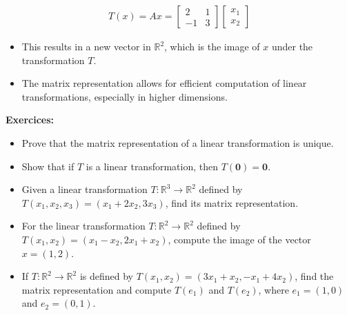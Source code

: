 \begin{frame}
    \begin{align*}
            T(x) = A x = \begin{bmatrix}
                2 & 1 \\
                -1 & 3
            \end{bmatrix} \begin{bmatrix}
                x_1 \\
                x_2
            \end{bmatrix}
    \end{align*}
    \begin{itemize}
                \item This results in a new vector in $\mathbb{R}^2$, which is the image of $x$ under the transformation $T$.
        \item The matrix representation allows for efficient computation of linear transformations, especially in higher dimensions.
    \end{itemize}
\end{frame}

\begin{frame}
\textbf{Exercices:}
\begin{itemize}
    \item Prove that the matrix representation of a linear transformation is unique.
    \item Show that if $T$ is a linear transformation, then $T(\mathbf{0}) = \mathbf{0}$.
    \item Given a linear transformation $T:\mathbb{R}^3 \rightarrow \mathbb{R}^2$ defined by $T(x_1, x_2, x_3) = (x_1 + 2x_2, 3x_3)$, find its matrix representation.
    \item For the linear transformation $T:\mathbb{R}^2 \rightarrow \mathbb{R}^2$ defined by $T(x_1, x_2) = (x_1 - x_2, 2x_1 + x_2)$, compute the image of the vector $x = (1, 2)$.
    \item If $T:\mathbb{R}^2 \rightarrow \mathbb{R}^2$ is defined by $T(x_1, x_2) = (3x_1 + x_2, -x_1 + 4x_2)$, find the matrix representation and compute $T(e_1)$ and $T(e_2)$, where $e_1 = (1, 0)$ and $e_2 = (0, 1)$.
\end{itemize}
\end{frame}

